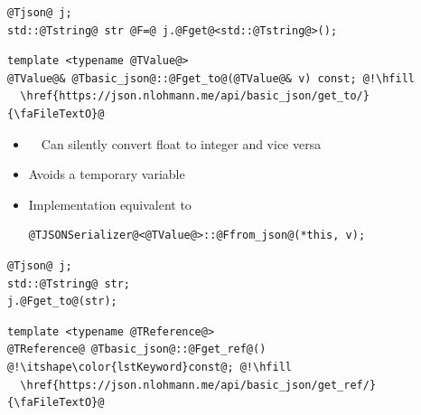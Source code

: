 \documentclass{slides}
\makeatletter
\newcommand{\@slidetitle}{}
\newcommand{\slidetitle}[1]{\renewcommand{\@slidetitle}{#1}}
\makeatother
\begin{document}
\begin{tcolorbox}
\begin{lstlisting}
@Tjson@ j;
std::@Tstring@ str @F=@ j.@Fget@<std::@Tstring@>();
\end{lstlisting}
\end{tcolorbox}

\pagebreak
\slidetitle{Value access}

\begin{tcolorbox}
\begin{lstlisting}
template <typename @TValue@>
@TValue@& @Tbasic_json@::@Fget_to@(@TValue@& v) const; @!\hfill
  \href{https://json.nlohmann.me/api/basic_json/get_to/}{\faFileTextO}@
\end{lstlisting}
\end{tcolorbox}
\vspace{0em}

\begin{itemize}[itemsep=0.7em]
  \item {\color{red}\faWarning}\ \ Can silently convert float to integer and vice versa
  \item Avoids a temporary variable
  \item Implementation equivalent to \vspace{-0.5em}
\begin{tcolorbox}
\begin{lstlisting}
@TJSONSerializer@<@TValue@>::@Ffrom_json@(*this, v);
\end{lstlisting}
\end{tcolorbox}
\end{itemize}

\begin{tcolorbox}
\begin{lstlisting}
@Tjson@ j;
std::@Tstring@ str;
j.@Fget_to@(str);
\end{lstlisting}
\end{tcolorbox}

\pagebreak
\slidetitle{Value access}

\begin{tcolorbox}
\begin{lstlisting}
template <typename @TReference@>
@TReference@ @Tbasic_json@::@Fget_ref@() @!\itshape\color{lstKeyword}const@; @!\hfill
  \href{https://json.nlohmann.me/api/basic_json/get_ref/}{\faFileTextO}@
\end{lstlisting}
\end{tcolorbox}
\vspace{0em}
\end{document}
